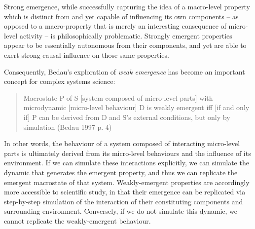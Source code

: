 \documentclass[review]{elsarticle}
\begin{document}

Strong emergence, while successfully capturing the idea of a macro-level property which is distinct from and yet capable of influencing its own components -- as opposed to a macro-property that is merely an interesting consequence of micro-level activity -- is philosophically problematic.  Strongly emergent properties appear to be essentially autonomous from their components, and yet are able to exert strong causal influence on those same properties.   

Consequently, Bedau's exploration of \emph{weak emergence} has become an important concept for complex systems science:
\begin{quote}
    Macrostate P of S [system composed of micro-level parts] with microdynamic [micro-level behaviour] D is weakly emergent iff [if and only if] P can be derived from D and S's external conditions, but only by simulation (Bedau 1997 p. 4)
\end{quote}

In other words, the behaviour of a system composed of interacting micro-level parts is ultimately derived from its micro-level behaviours and the influence of its environment.  If we can simulate these interactions explicitly, we can simulate the dynamic that generates the emergent property, and thus we can replicate the emergent macrostate of that system.  Weakly-emergent properties are accordingly more accessible to scientific study, in that their emergence can be replicated via step-by-step simulation of the interaction of their constituting components and surrounding environment.  Conversely, if we do not simulate this dynamic, we cannot replicate the weakly-emergent behaviour.  
\end{document}
